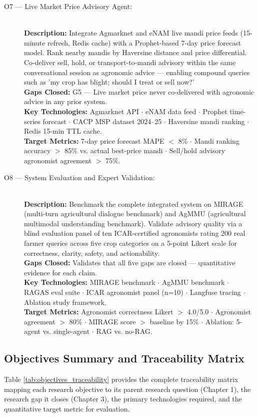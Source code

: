 \documentclass[12pt,a4paper]{article}
\begin{document}
\begin{description}
    \item[O7 --- Live Market Price Advisory Agent:] \hfill \\
    \textbf{Description:} Integrate Agmarknet and eNAM live mandi price feeds (15-minute refresh, Redis cache) with a Prophet-based 7-day price forecast model. Rank nearby mandis by Haversine distance and price differential. Co-deliver sell, hold, or transport-to-mandi advisory within the same conversational session as agronomic advice --- enabling compound queries such as 'my crop has blight; should I treat or sell now?' \\
    \textbf{Gaps Closed:} G5 --- Live market price never co-delivered with agronomic advice in any prior system. \\
    \textbf{Key Technologies:} Agmarknet API $\cdot$ eNAM data feed $\cdot$ Prophet time-series forecast $\cdot$ CACP MSP dataset 2024–25 $\cdot$ Haversine mandi ranking $\cdot$ Redis 15-min TTL cache. \\
    \textbf{Target Metrics:} 7-day price forecast MAPE $<$ 8\% $\cdot$ Mandi ranking accuracy $>$ 85\% vs. actual best-price mandi $\cdot$ Sell/hold advisory agronomist agreement $>$ 75\%.

    \item[O8 --- System Evaluation and Expert Validation:] \hfill \\
    \textbf{Description:} Benchmark the complete integrated system on MIRAGE (multi-turn agricultural dialogue benchmark) and AgMMU (agricultural multimodal understanding benchmark). Validate advisory quality via a blind evaluation panel of ten ICAR-certified agronomists rating 200 real farmer queries across five crop categories on a 5-point Likert scale for correctness, clarity, safety, and actionability. \\
    \textbf{Gaps Closed:} Validates that all five gaps are closed --- quantitative evidence for each claim. \\
    \textbf{Key Technologies:} MIRAGE benchmark $\cdot$ AgMMU benchmark $\cdot$ RAGAS eval suite $\cdot$ ICAR agronomist panel (n=10) $\cdot$ Langfuse tracing $\cdot$ Ablation study framework. \\
    \textbf{Target Metrics:} Agronomist correctness Likert $>$ 4.0/5.0 $\cdot$ Agronomist agreement $>$ 80\% $\cdot$ MIRAGE score $>$ baseline by 15\% $\cdot$ Ablation: 5-agent vs. single-agent $\cdot$ RAG vs. no-RAG.
\end{description}

\subsection{Objectives Summary and Traceability Matrix}
Table \ref{tab:objectives_traceability} provides the complete traceability matrix mapping each research objective to its parent research question (Chapter 1), the research gap it closes (Chapter 3), the primary technologies required, and the quantitative target metric for evaluation.
\end{document}
